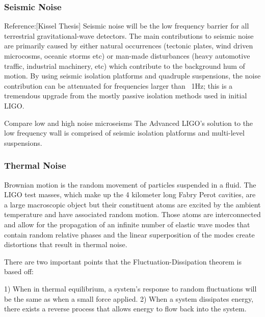 		\subsubsection{Seismic Noise}
		Reference:[Kissel Thesis]
		Seismic noise will be the low frequency barrier for all terrestrial gravitational-wave detectors.  The main contributions to seismic noise are primarily caused by either natural occurrences  (tectonic plates, wind driven microcosms, oceanic storms etc) or man-made disturbances (heavy automotive traffic, industrial machinery, etc) which contribute to the background hum of motion.       By using seismic isolation platforms and quadruple suspensions, the noise contribution can be attenuated for frequencies larger than ~1Hz; this is a tremendous upgrade from the mostly passive isolation methods used in initial LIGO.
		
		Compare low and high noise microseisms
		\cite{BlairBook}
		The Advanced LIGO's solution to the low frequency wall is comprised of seismic isolation platforms and multi-level suspensions.
		
		\cite{driggers_global}
		
		\cite{fabrice_sei1}
		
		\cite{fabrice_sei2}
		
		\cite{fabrice_strat}
		
		\cite{sei_isol}
		
		\cite{Hang_LF}
		
		\cite{Fritschel_alignment}
		
		\subsubsection{Thermal Noise}
		Brownian motion \cite{brownian_einstein} is the random movement of particles suspended in a fluid.  The LIGO test masses, which make up the 4 kilometer long Fabry Perot cavities, are a large macroscopic object but their constituent atoms are excited by the ambient temperature and have associated random motion. Those atoms are interconnected and allow for the propagation of an infinite number of elastic wave modes that contain random relative phases and the linear superposition of the modes create distortions that result in thermal noise.	
		
		There are two important points that the Fluctuation-Dissipation theorem is based off:
		
		1) When in thermal equilibrium, a system's response to random fluctuations will be the same as when a small force applied.
		2) When a system dissipates energy, there exists a reverse process that allows energy to flow back into the system.
		
